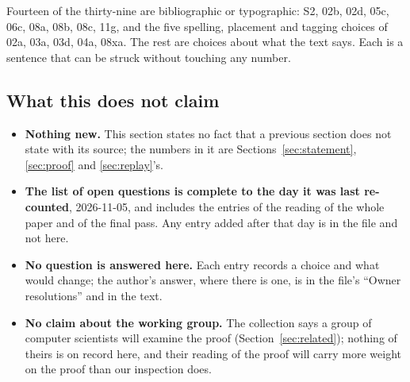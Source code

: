 Fourteen of the thirty-nine are bibliographic or typographic: S2, 02b,
02d, 05c, 06c, 08a, 08b, 08c, 11g, and the five spelling, placement and
tagging choices of 02a, 03a, 03d, 04a, 08xa. The rest are choices
about what the text says. Each is a sentence that can be struck
without touching any number.

\subsection{What this does not claim}
\label{sec:conclusion-not}

\begin{itemize}
\item \textbf{Nothing new.} This section states no fact that a
  previous section does not state with its source; the numbers in it
  are Sections~\ref{sec:statement}, \ref{sec:proof} and
  \ref{sec:replay}'s.
\item \textbf{The list of open questions is complete to the day it was
  last re-counted}, 2026-11-05, and includes the entries of the reading
  of the whole paper and of the final pass. Any entry added after that
  day is in the file and not here.
\item \textbf{No question is answered here.} Each entry records a
  choice and what would change; the author's answer, where there is
  one, is in the file's ``Owner resolutions'' and in the text.
\item \textbf{No claim about the working group.} The collection says a
  group of computer scientists will examine the proof
  (Section~\ref{sec:related}); nothing of theirs is on record here, and
  their reading of the proof will carry more weight on the proof than
  our inspection does.
\end{itemize}
\par\endgroup
